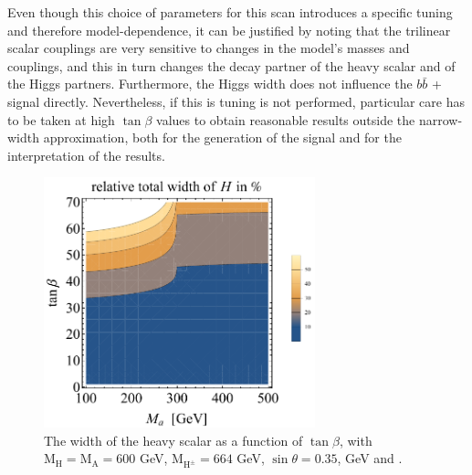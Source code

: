 Even though this choice of parameters for this scan introduces a specific tuning and therefore model-dependence, it can be justified by noting that the trilinear scalar couplings are very sensitive to changes in the model's masses and couplings, and this in turn changes the decay partner of the heavy scalar and of the Higgs partners. Furthermore, the Higgs width does not influence the $b\bar{b}$ + \MET signal directly. Nevertheless, if this is tuning is not performed, particular care has to be taken at high $\tan\beta$ values to obtain reasonable results outside the narrow-width approximation, both for the generation of the signal and for the interpretation of the results.  

\begin{figure}
  \centering
  \includegraphics[width=0.7\textwidth]{texinputs/04_grid/figures/DMHF/benchmarking/Gamma5.pdf}
  \caption{The width of the heavy scalar as a function of $\tan\beta$, with $\mathrm{M_H}=\mathrm{M_A}=600$ GeV, $\mathrm{M_{H^{\pm}}}=664$ GeV, $\sin\theta=0.35$,  GeV and .}
  \label{fig:higgsWidth}
\end{figure}

%
%
%
%
%
%
%
%
%
%
%
%
%
%
%


